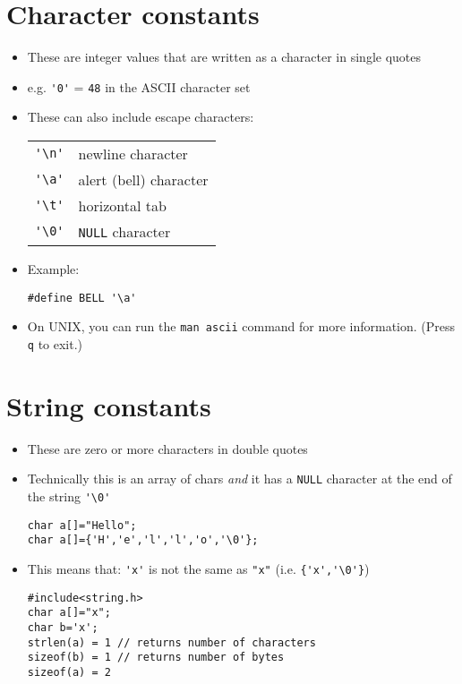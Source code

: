 \documentclass{article}
\begin{document}
\section{Character constants}
\begin{itemize}
\item These are integer values that are written as a character in single quotes
\item e.g. \verb!'0'! = \verb!48! in the ASCII  character set

\item These can also include escape characters:
\begin{tabular}{ll}
\verb!'\n'! & newline character\\
\verb!'\a'! & alert (bell) character\\
\verb!'\t'! & horizontal tab\\
\verb!'\0'! & \verb!NULL! character
\end{tabular}

\item Example:
\begin{verbatim}
#define BELL '\a'
\end{verbatim}

\item On UNIX, you can run the \verb!man ascii! command for more information. (Press \verb!q! to exit.)
\end{itemize}



\section{String constants}
\begin{itemize}
\item These are zero or more characters in double quotes
\item Technically this is an array of chars \emph{and} it has a \verb!NULL! character at the end of the string \verb!'\0'!
\begin{verbatim}
char a[]="Hello";
char a[]={'H','e','l','l','o','\0'};
\end{verbatim}
\item This means that:
\verb!'x'! is not the same as \verb!"x"! (i.e. \verb!{'x','\0'}!)

\begin{verbatim}
#include<string.h>
char a[]="x";
char b='x';
strlen(a) = 1 // returns number of characters
sizeof(b) = 1 // returns number of bytes
sizeof(a) = 2
\end{verbatim}
\end{itemize}
\end{document}
